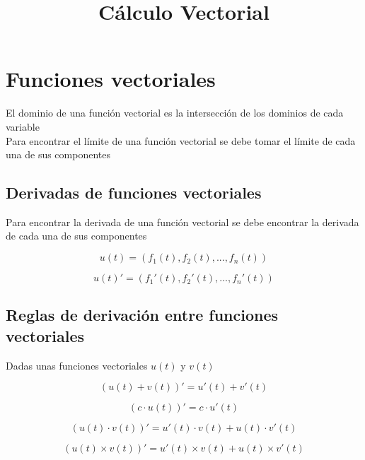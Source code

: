 \documentclass[12pt]{article}
\title{C\'{a}lculo Vectorial}
\begin{document}
\date{}
\maketitle

\section{Funciones vectoriales}


El dominio de una funci\'{o}n vectorial es la intersecci\'{o}n de los dominios de cada variable \\
Para encontrar el l\'{i}mite de una funci\'{o}n vectorial se debe tomar el l\'{i}mite de cada una de sus componentes


\subsection{Derivadas de funciones vectoriales}

Para encontrar la derivada de una funci\'{o}n vectorial se debe encontrar la derivada de cada una de sus componentes

\begin{equation}
 u(t) = (f_{1}(t),f_{2}(t),...,f_{n}(t)) 
\end{equation}

\begin{equation}
 u(t)' = (f_{1}'(t),f_{2}'(t),...,f_{n}'(t)) 
\end{equation}



\subsection{Reglas de derivaci\'{o}n entre funciones vectoriales}

Dadas unas funciones vectoriales $u(t)$ y $v(t)$

\begin{equation}
 (u(t) + v(t))' = u'(t) + v'(t)
\end{equation}

\begin{equation}
 (c\cdot u(t))' = c \cdot u'(t)
\end{equation}

\begin{equation}
 (u(t) \cdot v(t))' = u'(t) \cdot v(t) + u(t) \cdot v'(t)
\end{equation}

\begin{equation}
 (u(t) \times v(t))' = u'(t) \times v(t) + u(t) \times v'(t)
\end{equation}
\end{document}
